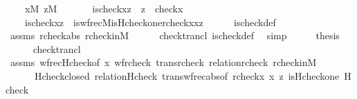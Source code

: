 \begin{isabellebody}
\ \ \ \ {\isachardoublequoteopen}x{\isasymin}M{\isachardoublequoteclose}\ {\isachardoublequoteopen}z{\isasymin}M{\isachardoublequoteclose}\isanewline
\ \ \isanewline
\ \ \ \ {\isachardoublequoteopen}is{\isacharunderscore}{\kern0pt}check{\isacharparenleft}{\kern0pt}x{\isacharcomma}{\kern0pt}z{\isacharparenright}{\kern0pt}\ {\isasymlongleftrightarrow}\ z\ {\isacharequal}{\kern0pt}\ check{\isacharparenleft}{\kern0pt}x{\isacharparenright}{\kern0pt}{\isachardoublequoteclose}\isanewline
%
\isadelimproof
%
\endisadelimproof
%
\isatagproof
{}\isamarkupfalse%
\ {\isacharminus}{\kern0pt}\isanewline
\ \ \isamarkupfalse%
\isanewline
\ \ \ \ {\isachardoublequoteopen}is{\isacharunderscore}{\kern0pt}check{\isacharparenleft}{\kern0pt}x{\isacharcomma}{\kern0pt}z{\isacharparenright}{\kern0pt}\ {\isasymlongleftrightarrow}\ is{\isacharunderscore}{\kern0pt}wfrec{\isacharparenleft}{\kern0pt}{\isacharhash}{\kern0pt}{\isacharhash}{\kern0pt}M{\isacharcomma}{\kern0pt}is{\isacharunderscore}{\kern0pt}Hcheck{\isacharparenleft}{\kern0pt}one{\isacharparenright}{\kern0pt}{\isacharcomma}{\kern0pt}rcheck{\isacharparenleft}{\kern0pt}x{\isacharparenright}{\kern0pt}{\isacharcomma}{\kern0pt}x{\isacharcomma}{\kern0pt}z{\isacharparenright}{\kern0pt}{\isachardoublequoteclose}\isanewline
\ \ \ \ \isamarkupfalse%
\ is{\isacharunderscore}{\kern0pt}check{\isacharunderscore}{\kern0pt}def\ \isamarkupfalse%
\ assms\ rcheck{\isacharunderscore}{\kern0pt}abs\ rcheck{\isacharunderscore}{\kern0pt}in{\isacharunderscore}{\kern0pt}M\isanewline
\ \ \ \ \isamarkupfalse%
\ check{\isacharunderscore}{\kern0pt}trancl\ is{\isacharunderscore}{\kern0pt}check{\isacharunderscore}{\kern0pt}def\ \isamarkupfalse%
\ simp\isanewline
\ \ \isamarkupfalse%
\ \isamarkupfalse%
\ {\isacharquery}{\kern0pt}thesis\isanewline
\ \ \ \ \isamarkupfalse%
\ check{\isacharunderscore}{\kern0pt}trancl\isanewline
\ \ \ \ \isamarkupfalse%
\ assms\ wfrec{\isacharunderscore}{\kern0pt}Hcheck{\isacharbrackleft}{\kern0pt}of\ x{\isacharbrackright}{\kern0pt}\ wf{\isacharunderscore}{\kern0pt}rcheck\ trans{\isacharunderscore}{\kern0pt}rcheck\ relation{\isacharunderscore}{\kern0pt}rcheck\ rcheck{\isacharunderscore}{\kern0pt}in{\isacharunderscore}{\kern0pt}M\isanewline
\ \ \ \ \ \ Hcheck{\isacharunderscore}{\kern0pt}closed\ relation{}{\isacharunderscore}{\kern0pt}Hcheck\ trans{\isacharunderscore}{\kern0pt}wfrec{\isacharunderscore}{\kern0pt}abs{\isacharbrackleft}{\kern0pt}of\ {\isachardoublequoteopen}rcheck{\isacharparenleft}{\kern0pt}x{\isacharparenright}{\kern0pt}{\isachardoublequoteclose}\ x\ z\ {\isachardoublequoteopen}is{\isacharunderscore}{\kern0pt}Hcheck{\isacharparenleft}{\kern0pt}one{\isacharparenright}{\kern0pt}{\isachardoublequoteclose}\ Hcheck{\isacharbrackright}{\kern0pt}\isanewline

\end{isabellebody}
